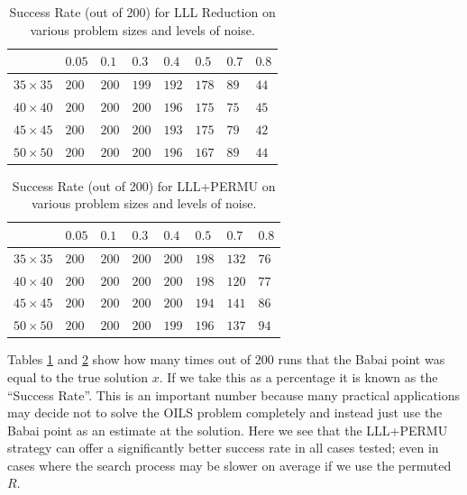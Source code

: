 \documentclass[12pt,Bold,letterpaper]{mcgilletdclass}
\begin{document}
\begin{table} 
\caption{Success Rate (out of 200) for LLL Reduction on various problem sizes and levels of noise.}
 \label{tab:successRateLLL}
\begin{tabular}{|l|l|l|l|l|l|l|l|}
\hline
 &              $0.05$ & $0.1$ & $0.3$ & $0.4$ & $0.5$ & $0.7$ & $0.8$ \\ \hline
$35 \times 35$& $200$  & $200$ & $199$ & $192$ & $178$ & $89$  & $44$\\ \hline
$40 \times 40$& $200$  & $200$ & $200$ & $196$ & $175$ & $75$  & $45$\\ \hline
$45 \times 45$& $200$  & $200$ & $200$ & $193$ & $175$ & $79$  & $42$\\ \hline
$50 \times 50$& $200$  & $200$ & $200$ & $196$ & $167$ & $89$  & $44$\\
\hline
\end{tabular}
\end{table}


\begin{table}
\caption{Success Rate (out of 200) for LLL+PERMU on various problem sizes and levels of noise.}
\label{tab:successRatePermu}
\begin{tabular}{|l|l|l|l|l|l|l|l|}  
\hline
 &              $0.05$ & $0.1$ & $0.3$ & $0.4$ & $0.5$ & $0.7$ & $0.8$ \\ \hline
$35 \times 35$& $200$  & $200$ & $200$ & $200$ & $198$ & $132$  & $76$\\ \hline
$40 \times 40$& $200$  & $200$ & $200$ & $200$ & $198$ & $120$  & $77$\\ \hline
$45 \times 45$& $200$  & $200$ & $200$ & $200$ & $194$ & $141$  & $86$\\ \hline
$50 \times 50$& $200$  & $200$ & $200$ & $199$ & $196$ & $137$  & $94$\\
\hline
\end{tabular}
\end{table}

Tables \ref{tab:successRateLLL} and \ref{tab:successRatePermu} show how many times out of $200$ runs that the Babai point was equal to the true solution $x$. If we take this as a percentage it is known as the ``Success Rate''. This is an important number because many practical applications may decide not to solve the OILS problem completely and instead just use the Babai point as an estimate at the solution. Here we see that the LLL+PERMU strategy can offer a significantly better success rate in all cases tested; even in cases where the search process may be slower on average if we use the permuted $R$.
\end{document}
